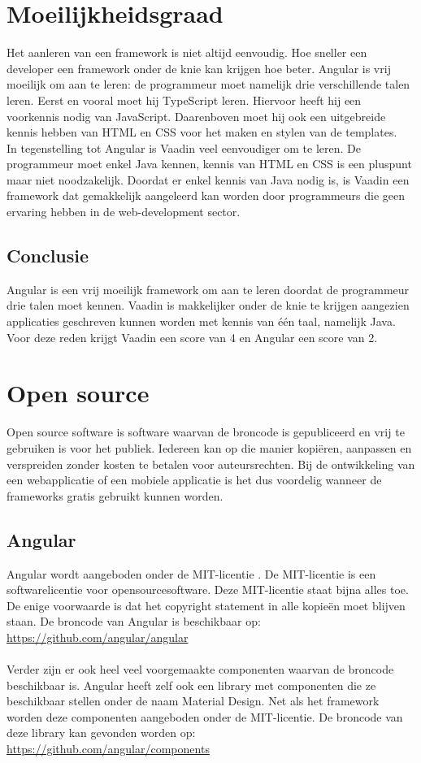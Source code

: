 \section{Moeilijkheidsgraad}
Het aanleren van een framework is niet altijd eenvoudig. Hoe sneller een developer een framework onder de knie kan krijgen hoe beter. 
Angular is vrij moeilijk om aan te leren: de programmeur moet namelijk drie verschillende talen leren.
Eerst en vooral moet hij TypeScript leren. Hiervoor heeft hij een voorkennis nodig van JavaScript. Daarenboven moet hij ook een uitgebreide kennis hebben van HTML en CSS voor het maken en stylen van de templates.
\\
In tegenstelling tot Angular is Vaadin veel eenvoudiger om te leren. De programmeur moet enkel Java kennen, kennis van HTML en CSS is een pluspunt maar niet noodzakelijk.
Doordat er enkel kennis van Java nodig is, is Vaadin een framework dat gemakkelijk aangeleerd kan worden door programmeurs die geen ervaring hebben in de web-development sector.

\subsection{Conclusie}
Angular is een vrij moeilijk framework om aan te leren doordat de programmeur drie talen moet kennen. Vaadin is makkelijker onder de knie te krijgen aangezien applicaties geschreven kunnen worden met kennis van één taal, namelijk Java. 
Voor deze reden krijgt Vaadin een score van 4 en Angular een score van 2.


\section{Open source}
Open source software is software waarvan de broncode is gepubliceerd en vrij te gebruiken is voor het publiek. Iedereen kan op die manier kopiëren, aanpassen en verspreiden zonder kosten te betalen voor auteursrechten.
Bij de ontwikkeling van een webapplicatie of een mobiele applicatie is het dus voordelig wanneer de frameworks gratis gebruikt kunnen worden. 

\subsection{Angular} \label{Open source Angular}
Angular wordt aangeboden onder de MIT-licentie \autocite{MIT2019}.
De MIT-licentie is een softwarelicentie voor opensourcesoftware. Deze MIT-licentie staat bijna alles toe. De enige voorwaarde is dat het copyright statement in alle kopieën moet blijven staan.
De broncode van Angular is beschikbaar op: 
\\
\url{https://github.com/angular/angular} \\ \\
Verder zijn er ook heel veel voorgemaakte componenten waarvan de broncode beschikbaar is. Angular heeft zelf ook een library met componenten die ze beschikbaar stellen onder de naam Material Design. Net als het framework worden deze componenten aangeboden onder de MIT-licentie. De broncode van deze library kan gevonden worden op:
\\
\url{https://github.com/angular/components}

